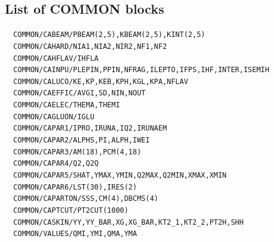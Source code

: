 \documentclass[11pt]{article} \usepackage{mystyle-new}
\begin{document}
\subsection{List of COMMON blocks}
\verb"  COMMON/CABEAM/PBEAM(2,5),KBEAM(2,5),KINT(2,5)" \\
\verb"  COMMON/CAHARD/NIA1,NIA2,NIR2,NF1,NF2"\\
\verb"  COMMON/CAHFLAV/IHFLA"\\
\verb"  COMMON/CAINPU/PLEPIN,PPIN,NFRAG,ILEPTO,IFPS,IHF,INTER,ISEMIH"\\
\verb"  COMMON/CALUCO/KE,KP,KEB,KPH,KGL,KPA,NFLAV"\\
\verb"  COMMON/CAEFFIC/AVGI,SD,NIN,NOUT"\\
\verb"  COMMON/CAELEC/THEMA,THEMI"\\
\verb"  COMMON/CAGLUON/IGLU"\\
\verb"  COMMON/CAPAR1/IPRO,IRUNA,IQ2,IRUNAEM"\\
\verb"  COMMON/CAPAR2/ALPHS,PI,ALPH,IWEI"\\
\verb"  COMMON/CAPAR3/AM(18),PCM(4,18)"\\
\verb"  COMMON/CAPAR4/Q2,Q2Q"\\
\verb"  COMMON/CAPAR5/SHAT,YMAX,YMIN,Q2MAX,Q2MIN,XMAX,XMIN"\\
\verb"  COMMON/CAPAR6/LST(30),IRES(2)"\\
\verb"  COMMON/CAPARTON/SSS,CM(4),DBCMS(4)"\\
\verb"  COMMON/CAPTCUT/PT2CUT(1000)"\\
\verb"  COMMON/CASKIN/YY,YY_BAR,XG,XG_BAR,KT2_1,KT2_2,PT2H,SHH"\\
\verb"  COMMON/VALUES/QMI,YMI,QMA,YMA"\\
\end{document}
